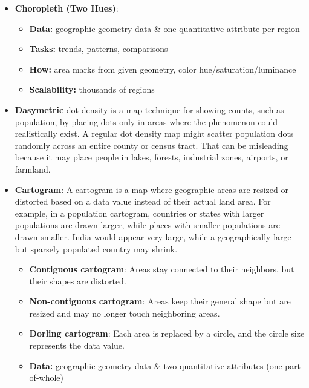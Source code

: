 \documentclass{report}
\begin{document}
\begin{itemize}
        \item \textbf{Choropleth (Two Hues)}: 
            \bigbreak \noindent 
            \begin{itemize}
                \item \textbf{Data:} geographic geometry data & one quantitative attribute per region
                \item \textbf{Tasks:} trends, patterns, comparisons
                \item \textbf{How:} area marks from given geometry, color hue/saturation/luminance
                \item \textbf{Scalability:} thousands of regions 
            \end{itemize}
        \item \textbf{Dasymetric} dot density is a map technique for showing counts, such as population, by placing dots only in areas where the phenomenon could realistically exist.
            \bigbreak \noindent 
            A regular dot density map might scatter population dots randomly across an entire county or census tract. That can be misleading because it may place people in lakes, forests, industrial zones, airports, or farmland.
        \item \textbf{Cartogram}: A cartogram is a map where geographic areas are resized or distorted based on a data value instead of their actual land area.
            \bigbreak \noindent 
            For example, in a population cartogram, countries or states with larger populations are drawn larger, while places with smaller populations are drawn smaller. India would appear very large, while a geographically large but sparsely populated country may shrink.
            \begin{itemize}
                \item \textbf{Contiguous cartogram}: Areas stay connected to their neighbors, but their shapes are distorted.
                \item \textbf{Non-contiguous cartogram}: Areas keep their general shape but are resized and may no longer touch neighboring areas.
                \item \textbf{Dorling cartogram}: Each area is replaced by a circle, and the circle size represents the data value.
            \end{itemize}
            \begin{itemize}
                \item \textbf{Data:} geographic geometry data \& two quantitative attributes (one part-of-whole)

\end{itemize}
\end{itemize}
\end{document}
